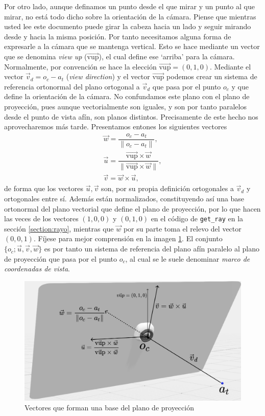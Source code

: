 Por otro lado, aunque definamos un punto desde el que mirar y un punto al que mirar, no está todo dicho sobre la orientación de la cámara. Piense que mientras usted lee este documento puede girar la cabeza hacia un lado y seguir mirando desde y hacia la misma posición. Por tanto necesitamos alguna forma de expresarle a la cámara que se mantenga vertical. Esto se hace mediante un vector que se denomina \textit{view up} ($\overrightarrow{\mathrm{vup}}$), el cual define ese `arriba' para la cámara. Normalmente, por convención se hace la elección $\overrightarrow{\mathrm{vup}}=(0,1,0)$. Mediante el vector $\vec{v}_d=o_c-a_t$ (\textit{view direction}) y el vector $\overrightarrow{\mathrm{vup}}$ podemos crear un sistema de referencia ortonormal del plano ortogonal a $\vec{v}_d$ que pasa por el punto $o_c$ y que define la orientación de la cámara. No confundamos este plano con el plano de proyección, pues aunque vectorialmente son iguales, y son por tanto paralelos desde el punto de vista afín, son planos distintos. Precisamente de este hecho nos aprovecharemos más tarde. Presentamos entones los siguientes vectores
\begin{eqnarray*}
    \vec w = \dfrac{o_c-a_t}{\|o_c-a_t\|}, \\
    \vec u = \dfrac{\overrightarrow{\mathrm{vup}}\times \vec w}{\|\overrightarrow{\mathrm{vup}} \times \vec w\|}, \\
    \vec v = \vec w\times \vec u,
\end{eqnarray*}
de forma que los vectores $\vec u,\vec v$ son, por su propia definición ortogonales a $\vec{v}_d$ y ortogonales entre sí. Además están normalizados, constituyendo así una base ortonormal del plano vectorial que define el plano de proyección, por lo que hacen las veces de los vectores $(1,0,0)$ y $(0,1,0)$ en el código de \verb|get_ray| en la sección \ref{section:rayo}, mientras que $\vec w$ por su parte toma el relevo del vector $(0,0,1)$. Fíjese para mejor comprensión en la imagen \ref{fig:vectores}. El conjunto $\{o_c; \vec u, \vec v,\vec w\}$ es por tanto un sistema de referencia del plano afín paralelo al plano de proyección que pasa por el punto $o_c$, al cual se le suele denominar \textit{marco de coordenadas de vista}.

\begin{figure} [ht]
    \centering
    \includegraphics[scale = 0.25]{img/C7/plano.png}
    \caption{Vectores que forman una base del plano de proyección}
    \label{fig:vectores}
\end{figure}

